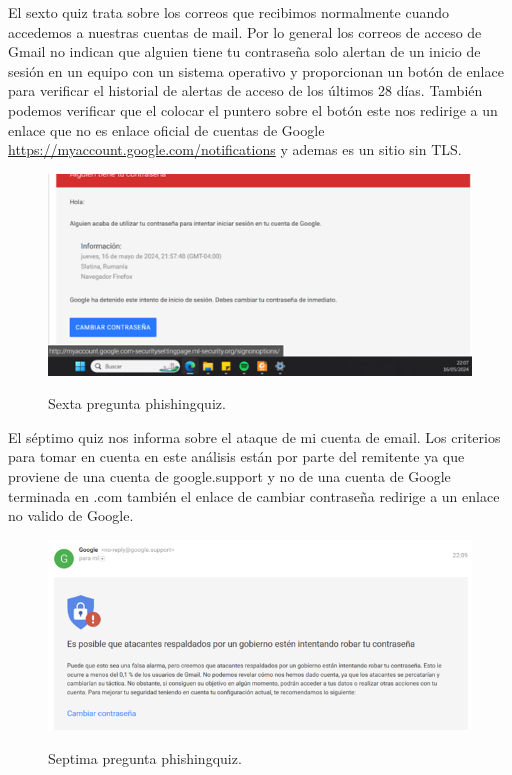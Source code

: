 \documentclass[stu, 11pt, letterpaper, donotrepeattitle, floatsintext, natbib]{apa7}
\begin{document}
El sexto quiz trata sobre los correos que recibimos normalmente cuando accedemos a nuestras cuentas de mail. Por lo general los correos de acceso de Gmail no indican que alguien tiene tu contraseña solo alertan de un inicio de sesión en un equipo con un sistema operativo y proporcionan un botón de enlace para verificar el historial de alertas de acceso de los últimos 28 días. También podemos verificar que el colocar el puntero sobre el botón este nos redirige a un enlace que no es enlace oficial de cuentas de Google \url{https://myaccount.google.com/notifications}  y ademas es un sitio sin TLS.

\begin{figure}[H]
    \centering
    \caption{Sexta pregunta phishingquiz.}
    \includegraphics[width=0.75\linewidth]{phishing9.png} %
    \label{fig:OverallEffect}
\end{figure}

El séptimo quiz nos informa sobre el ataque de mi cuenta de email. Los criterios para tomar en cuenta en este análisis están por parte del remitente ya que proviene de una cuenta de google.support  y no de una cuenta de Google terminada en .com también el enlace de cambiar contraseña redirige a un enlace no valido de Google.

\begin{figure}[H]
    \centering
    \caption{Septima pregunta phishingquiz.}
    \includegraphics[width=0.75\linewidth]{phishing10.png} %
    \label{fig:OverallEffect}
\end{figure}
\end{document}
